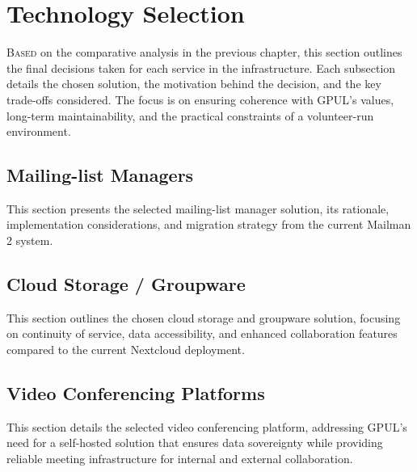 %

\chapter{Technology Selection}
\label{chap:technology-selection}

\lettrine{B}{ased} on the comparative analysis in the previous chapter, this section outlines the final decisions taken for each service in the infrastructure.  
Each subsection details the chosen solution, the motivation behind the decision, and the key trade-offs considered.  
The focus is on ensuring coherence with GPUL's values, long-term maintainability, and the practical constraints of a volunteer-run environment.

\section{Mailing-list Managers}

This section presents the selected mailing-list manager solution, its rationale, implementation considerations, and migration strategy from the current Mailman 2 system.

\section{Cloud Storage / Groupware}

This section outlines the chosen cloud storage and groupware solution, focusing on continuity of service, data accessibility, and enhanced collaboration features compared to the current Nextcloud deployment.

\section{Video Conferencing Platforms}

This section details the selected video conferencing platform, addressing GPUL's need for a self-hosted solution that ensures data sovereignty while providing reliable meeting infrastructure for internal and external collaboration.

